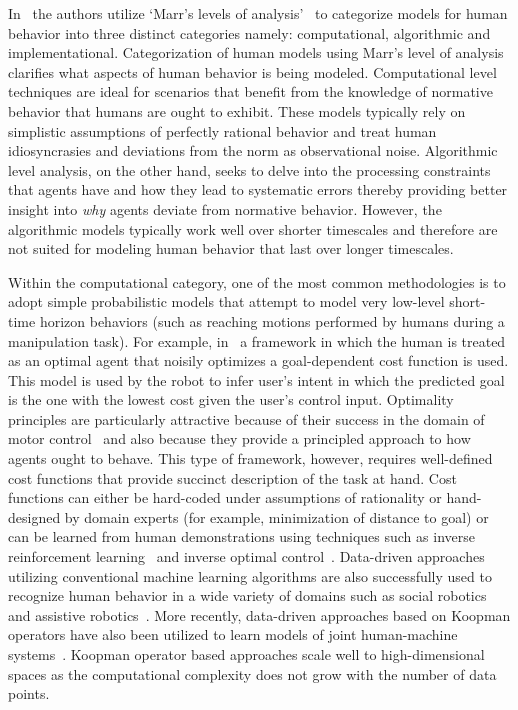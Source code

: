\documentclass[12pt]{article}
\begin{document}
 In~\cite{hiatt2017human} the authors utilize `Marr's levels of analysis'~\cite{marr1982vision} to categorize models for human behavior into three distinct categories namely: computational, algorithmic and implementational.
Categorization of human models using Marr's level of analysis clarifies what aspects of human behavior is being modeled. Computational level techniques are ideal for scenarios that benefit from the knowledge of normative behavior that humans are ought to exhibit. These models typically rely on simplistic assumptions of perfectly rational behavior and treat human idiosyncrasies and deviations from the norm as observational noise. Algorithmic level analysis, on the other hand, seeks to delve into the processing constraints that agents have and how they lead to systematic errors thereby providing better insight into \textit{why} agents deviate from normative behavior. However, the algorithmic models typically work well over shorter timescales and therefore are not suited for modeling human behavior that last over longer timescales. 

Within the computational category, one of the most common methodologies is to adopt simple probabilistic models that attempt to model very low-level short-time horizon behaviors (such as reaching motions performed by humans during a manipulation task). For example, in~\cite{dragan2013policy} a framework in which the human is treated as an optimal agent that noisily optimizes a goal-dependent cost function is used. This model is used by the robot to infer user's intent in which the predicted goal is the one with the lowest cost given the user's control input. Optimality principles are particularly attractive because of their success in the domain of motor control~\cite{uno1989formation} and also because they provide a principled approach to how agents ought to behave. This type of framework, however, requires well-defined cost functions that provide succinct description of the task at hand. Cost functions can either be hard-coded under assumptions of rationality or hand-designed by domain experts (for example, minimization of distance to goal) or can be learned from human demonstrations using techniques such as inverse reinforcement learning~\cite{ziebart2008maximum} and inverse optimal control~\cite{dvijotham2010inverse}.
Data-driven approaches utilizing conventional machine learning algorithms are also successfully used to recognize human behavior in a wide variety of domains such as social robotics~\cite{mataric2007socially} and assistive robotics~\cite{goil2013using}. More recently, data-driven approaches based on Koopman operators have also been utilized to learn models of joint human-machine systems~\cite{broad2018learning}. Koopman operator based approaches scale well to high-dimensional spaces as the computational complexity does not grow with the number of data points. 
\end{document}
